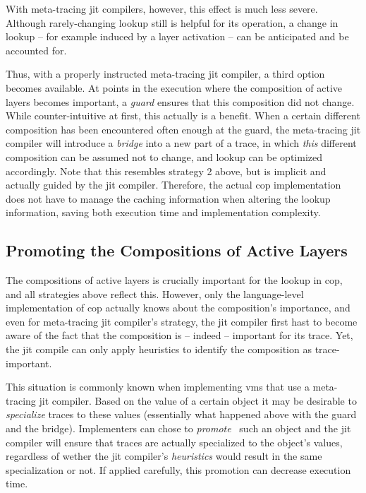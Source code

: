 \documentclass[preprint,english,10pt,nonatbib]{sigplanconf}
\begin{document}
With meta-tracing \ac{jit} compilers, however, this effect is much less
severe. Although rarely-changing lookup still is helpful for its operation, a
change in lookup \--- for example induced by a layer activation \--- can be
anticipated and be accounted for.

Thus, with a properly instructed meta-tracing \ac{jit} compiler, a third option
becomes available. At points in the execution where the composition of active
layers becomes important, a \emph{guard} ensures that this composition did not
change. While counter-intuitive at first, this actually is a benefit. When a
certain different composition has been encountered often enough at the guard,
the meta-tracing \ac{jit} compiler will introduce a \emph{bridge} into a new
part of a trace, in which \emph{this} different composition can be assumed not
to change, and lookup can be optimized accordingly. Note that this resembles
strategy 2 above, but is implicit and actually guided by the \ac{jit} compiler.
Therefore, the actual \ac{cop} implementation does not have to manage the
caching information when altering the lookup information, saving both execution
time and implementation complexity.

\subsection{Promoting the Compositions of Active Layers}

The compositions of active layers is crucially important for the lookup in
\ac{cop}, and all strategies above reflect this. However, only the
language-level implementation of \ac{cop} actually knows about the
composition's importance, and even for meta-tracing \ac{jit} compiler's
strategy, the \ac{jit} compiler first hast to become aware of the fact that the
composition is \--- indeed \--- important for its trace. Yet, the \ac{jit}
compile can only apply heuristics to identify the composition as
trace-important.

This situation is commonly known when implementing \acp{vm} that use a
meta-tracing \ac{jit} compiler. Based on the value of a certain object it may
be desirable to \emph{specialize} traces to these values (essentially what
happened above with the guard and the bridge).
Implementers can chose to \emph{promote}~\cite[\S
3.1]{bolz+:2011:runtime-feedback} such an object and the \ac{jit} compiler will
ensure that traces are actually specialized to the object's values,  regardless
of wether the \ac{jit} compiler's \emph{heuristics} would result in the same
specialization or not. If applied carefully, this promotion can decrease
execution time.
\end{document}
